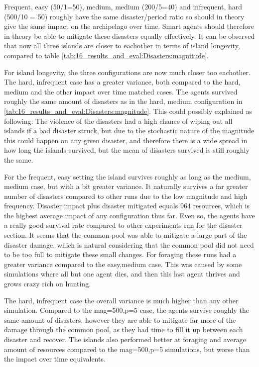 Frequent, easy (50/1=50), medium, medium (200/5=40) and infrequent, hard (500/10 = 50) roughly have the same disaster/period ratio so should in theory give the same impact on the archipelago over time. Smart agents should therefore in theory be able to mitigate these disasters equally effectively. It can be observed that now all three islands are closer to eachother in terms of island longevity, compared to table \ref{tab:16_results_and_eval:Disasters:magnitude}.

For island longevity, the three configurations are now much closer too eachother. The hard, infrequent case has a greater variance, both compared to the hard, medium and the other impact over time matched cases. The agents survived roughly the same amount of disasters as in the hard, medium configuration in \ref{tab:16_results_and_eval:Disasters:magnitude}. This could possibly explained as following: The violence of the disasters had a high chance of wiping out all islands if a bad disaster struck, but due to the stochastic nature of the magnitude this could happen on any given disaster, and therefore there is a wide spread in how long the islands survived, but the mean of disasters survived is still roughly the same. 

For the frequent, easy setting the island survives roughly as long as the medium, medium case, but with a bit greater variance. It naturally survives a far greater number of disasters compared to other runs due to the low magnitude and high frequency. Disaster impact plus disaster mitigated equals 964 resources, which is the highest average impact of any configuration thus far. Even so, the agents have a really good survival rate compared to other experiments ran for the disaster section. It seems that the common pool was able to mitigate a large part of the disaster damage, which is natural considering that the common pool did not need to be too full to mitigate these small changes. For foraging these runs had a greater variance compared to the easy,medium case. This was caused by some simulations where all but one agent dies, and then this last agent thrives and grows crazy rich on hunting.



The hard, infrequent case the overall variance is much higher than any other simulation. Compared to the mag=500,p=5 case, the agents survive roughly the same amount of disasters, however they are able to mitigate far more of the damage through the common pool, as they had time to fill it up between each disaster and recover. The islands also performed better at foraging and average amount of resources compared to the mag=500,p=5 simulations, but worse than the impact over time equivalents. 

